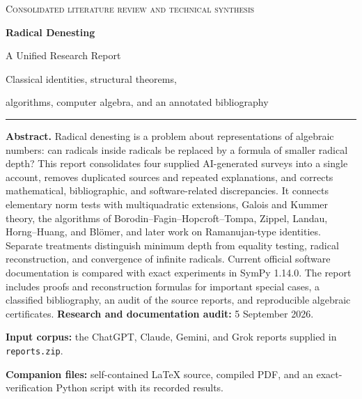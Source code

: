 \documentclass[11pt,a4paper]{article}
\theoremstyle{definition}
\theoremstyle{remark}
\numberwithin{equation}{section}
\begin{document}
\hypersetup{pageanchor=false}
\begin{titlepage}
\thispagestyle{empty}
\vspace*{1.1cm}
{\small\textsc{Consolidated literature review and technical synthesis}\par}
\vspace{1.0cm}
{\Huge\bfseries\color{inkblue} Radical Denesting\par}
\vspace{0.45cm}
{\LARGE A Unified Research Report\par}
\vspace{0.8cm}
{\large Classical identities, structural theorems,\par
algorithms, computer algebra, and an annotated bibliography\par}
\vspace{1.0cm}
\rule{\textwidth}{0.6pt}
\vspace{0.5cm}
\textbf{Abstract.}
Radical denesting is a problem about representations of algebraic numbers: can radicals inside radicals be replaced by a formula of smaller radical depth? This report consolidates four supplied AI-generated surveys into a single account, removes duplicated sources and repeated explanations, and corrects mathematical, bibliographic, and software-related discrepancies. It connects elementary norm tests with multiquadratic extensions, Galois and Kummer theory, the algorithms of Borodin--Fagin--Hopcroft--Tompa, Zippel, Landau, Horng--Huang, and Bl\"omer, and later work on Ramanujan-type identities. Separate treatments distinguish minimum depth from equality testing, radical reconstruction, and convergence of infinite radicals. Current official software documentation is compared with exact experiments in SymPy 1.14.0. The report includes proofs and reconstruction formulas for important special cases, a classified bibliography, an audit of the source reports, and reproducible algebraic certificates.
\vfill
\textbf{Research and documentation audit:} 5 September 2026.\par
\textbf{Input corpus:} the ChatGPT, Claude, Gemini, and Grok reports supplied in \texttt{reports.zip}.\par
\textbf{Companion files:} self-contained \LaTeX{} source, compiled PDF, and an exact-verification Python script with its recorded results.
\vspace*{0.6cm}
\end{titlepage}
\hypersetup{pageanchor=true}
\begingroup
\small
\setlength{\parskip}{0pt}
\tableofcontents
\endgroup
\clearpage
{}
\end{document}
